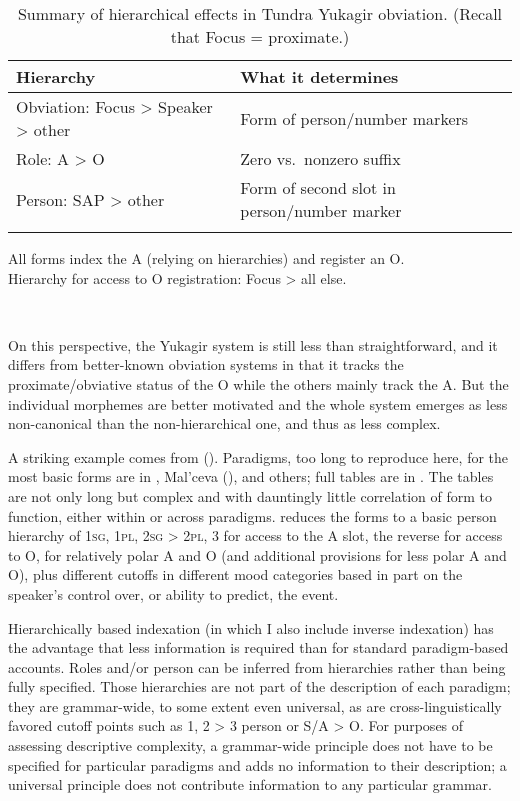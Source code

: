 \documentclass[output=collectionpaper]{langsci/langscibook}
\begin{document}
\begin{table}
\caption{Summary of hierarchical effects in Tundra Yukagir obviation. (Recall that Focus = proximate.)}
\label{extab:Nich:20}

\begin{tabularx}{\textwidth}{lX}
\lsptoprule
	{Hierarchy}	 &		{What it determines} \\
			 \midrule
	Obviation: Focus > Speaker > other	 &Form of person/number markers \\
	Role:  	A > O	 &			Zero vs.\ nonzero suffix \\
	Person: SAP > other		 &	Form of second slot in person/number marker\\
	\lspbottomrule
\end{tabularx}
	\parbox{\textwidth}{\footnotesize All forms index the A (relying on hierarchies) and register an O.\\ Hierarchy for access to O registration: Focus > all else.}\\
\end{table}

On this perspective, the Yukagir system is still less than straightforward, and it differs from better-known obviation systems in that it tracks the proximate/obvia\-tive status of the O while the others mainly track the A. But the individual morphemes are better motivated and the whole system emerges as less non-canonical than the non-hierarchical one, and thus as less complex.

A striking example comes from  (). Paradigms, too long to reproduce here, for the most basic forms are in \citet{Nagayam2003}, Mal'ce\-va (\citeyear{Malcev1998}), and others; full tables are in \citet[639--648]{Kibrik2004}. The tables are not only long but complex and with dauntingly little correlation of form to function, either within or across paradigms. \citet{Kibrik2003} reduces the forms to a basic person hierarchy of \textsc{1sg}, \textsc{1pl}, \textsc{2sg} > \textsc{2pl}, 3 for access to the A slot, the reverse for access to O, for relatively polar A and O (and additional provisions for less polar A and O), plus different cutoffs in different mood categories based in part on the speaker's control over, or ability to predict, the event.

Hierarchically based indexation (in which I also include inverse indexation) has the advantage that less information is required than for standard paradigm-based accounts. Roles and/or person can be inferred from hierarchies rather than being fully specified. Those hierarchies are not part of the description of each paradigm; they are grammar-wide, to some extent even universal, as are cross-linguistically favored cutoff points such as 1, 2 > 3 person or S/A > O. For purposes of assessing descriptive complexity, a grammar-wide principle does not have to be specified for particular paradigms and adds no information to their description; a universal principle does not contribute information to any particular grammar.
\end{document}
